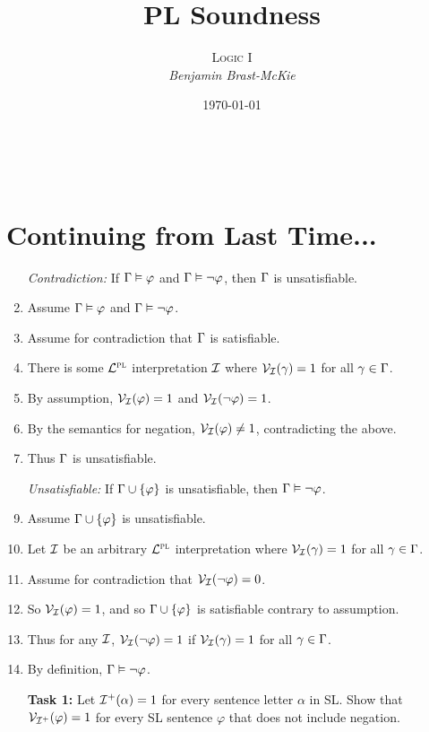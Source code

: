 \documentclass[a4paper, 11pt]{article} %
\title{\textbf{PL Soundness}} %
\author{\textsc{Logic I}\\ \em Benjamin Brast-McKie} %
\date{\today} %
\makeatletter
\renewcommand{\maketitle}{
\begin{flushright}
{\LARGE\@title}

\vspace{10pt}

{\@author}
\\ \@date
\end{flushright}

\vspace{0pt}

}
\makeatother
\begin{document}
\maketitle %

\thispagestyle{empty}


\section*{Continuing from Last Time...}

\begin{enumerate}
  \item[\it Contradiction:] If $\Gamma \vDash \varphi$ and $\Gamma \vDash \neg\varphi$, then $\Gamma$ is unsatisfiable.
    \item Assume $\Gamma \vDash \varphi$ and $\Gamma \vDash \neg\varphi$.
    \item Assume for contradiction that $\Gamma$ is satisfiable. 
    \item There is some $\mathcal{L}^{\textsc{pl}}$ interpretation $\mathcal{I}$ where $\mathcal{V}_{\mathcal{I}}(\gamma) = 1$ for all $\gamma \in \Gamma$.
    \item By assumption, $\mathcal{V}_{\mathcal{I}}(\varphi) = 1$ and $\mathcal{V}_{\mathcal{I}}(\neg \varphi) = 1$.
    \item By the semantics for negation, $\mathcal{V}_{\mathcal{I}}(\varphi) \neq 1$, contradicting the above.
    \item Thus $\Gamma$ is unsatisfiable. 
  \item[\it Unsatisfiable:] If $\Gamma \cup \lbrace\varphi\rbrace$ is unsatisfiable, then $\Gamma \vDash \neg\varphi$.
    \item Assume $\Gamma \cup \lbrace\varphi\rbrace$ is unsatisfiable.
    \item Let $\mathcal{I}$ be an arbitrary $\mathcal{L}^{\textsc{pl}}$ interpretation where $\mathcal{V}_{\mathcal{I}}(\gamma) = 1$ for all $\gamma \in \Gamma$. 
    \item Assume for contradiction that $\mathcal{V}_{\mathcal{I}}(\neg \varphi) = 0$.
    \item So $\mathcal{V}_{\mathcal{I}}(\varphi) = 1$, and so $\Gamma \cup \lbrace\varphi\rbrace$ is satisfiable contrary to assumption.
    \item Thus for any $\mathcal{I}$, $\mathcal{V}_{\mathcal{I}}(\neg \varphi) = 1$ if $\mathcal{V}_{\mathcal{I}}(\gamma) = 1$ for all $\gamma \in \Gamma$.
    \item By definition, $\Gamma \vDash \neg\varphi$.
  \item[\bf Task 1:] Let $\mathcal{I}^+(\alpha)=1$ for every sentence letter $\alpha$ in SL. Show that $\mathcal{V}_{\mathcal{I}^+}(\varphi)=1$ for every SL sentence $\varphi$ that does not include negation. 

\end{enumerate}
\end{document}
